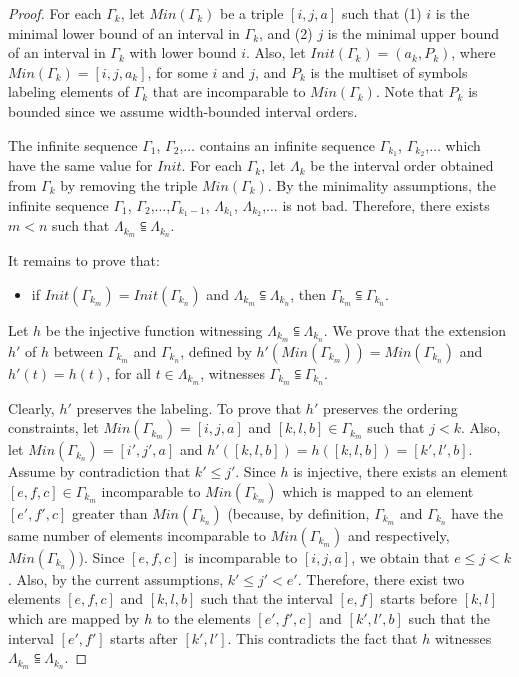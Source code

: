 \begin{proof}
For each $\Gamma_k$, let $Min(\Gamma_k)$ be a triple $[i,j,a]$ such that
(1) $i$ is the minimal lower bound of an interval in $\Gamma_k$, and
(2) $j$ is the minimal upper bound of an interval in $\Gamma_k$ with lower bound $i$.
Also, let $Init(\Gamma_k) = (a_k, P_k)$, where $Min(\Gamma_k)=[i,j,a_k]$, for some $i$ and $j$, and $P_k$ is the multiset of symbols labeling elements of $\Gamma_k$ that are incomparable to $Min(\Gamma_k)$. Note that $P_k$ is bounded since we assume width-bounded interval orders.

The infinite sequence $\Gamma_1$, $\Gamma_2$,$\ldots$ contains an infinite sequence $\Gamma_{k_1}$, $\Gamma_{k_2}$,$\ldots$ which have the same value for $Init$.
For each $\Gamma_k$, let $\Lambda_k$ be the interval order obtained from $\Gamma_k$ by removing the triple $Min(\Gamma_k)$.
By the minimality assumptions, the infinite sequence $\Gamma_1$, $\Gamma_2$,$\ldots$,$\Gamma_{k_1-1}$, $\Lambda_{k_1}$, $\Lambda_{k_2}$,$\ldots$ is not bad.
Therefore, there exists $m<n$ such that $\Lambda_{k_m}\subseteqq \Lambda_{k_n}$.

It remains to prove that:
\begin{itemize}
	\item if $Init(\Gamma_{k_m})=Init(\Gamma_{k_n})$ and $\Lambda_{k_m}\subseteqq \Lambda_{k_n}$, then $\Gamma_{k_m}\subseteqq \Gamma_{k_n}$.
\end{itemize}

Let $h$ be the injective function witnessing $\Lambda_{k_m}\subseteqq \Lambda_{k_n}$. We prove that the extension $h'$ of $h$ between $\Gamma_{k_m}$ and $\Gamma_{k_n}$, defined by $h'(Min(\Gamma_{k_m}))=Min(\Gamma_{k_n})$ and $h'(t)=h(t)$, for all $t\in \Lambda_{k_m}$, witnesses $\Gamma_{k_m}\subseteqq \Gamma_{k_n}$.

Clearly, $h'$ preserves the labeling.
To prove that $h'$ preserves the ordering constraints, let $Min(\Gamma_{k_m})=[i,j,a]$ and $[k,l,b]\in \Gamma_{k_m}$ such that $j< k$. Also, let $Min(\Gamma_{k_n})=[i',j',a]$ and $h'([k,l,b])=h([k,l,b])=[k',l',b]$. Assume by contradiction that $k'\leq j'$. Since $h$ is injective, there exists an element $[e,f,c]\in \Gamma_{k_m}$ incomparable to $Min(\Gamma_{k_m})$ which is mapped to an element $[e',f',c]$ greater than $Min(\Gamma_{k_n})$ (because, by definition, $\Gamma_{k_m}$ and $\Gamma_{k_n}$ have the same number of elements incomparable to $Min(\Gamma_{k_m})$ and respectively, $Min(\Gamma_{k_n})$).
Since $[e,f,c]$ is incomparable to $[i,j,a]$, we obtain that $e\leq j< k$. Also, by the current assumptions, $k'\leq j'<e'$. Therefore, there exist two elements $[e,f,c]$ and $[k,l,b]$ such that the interval $[e,f]$ starts before $[k,l]$ which are mapped by $h$ to the elements $[e',f',c]$ and $[k',l',b]$ such that the interval $[e',f']$ starts after $[k',l']$. This contradicts the fact that $h$ witnesses $\Lambda_{k_m}\subseteqq \Lambda_{k_n}$.


\end{proof}
